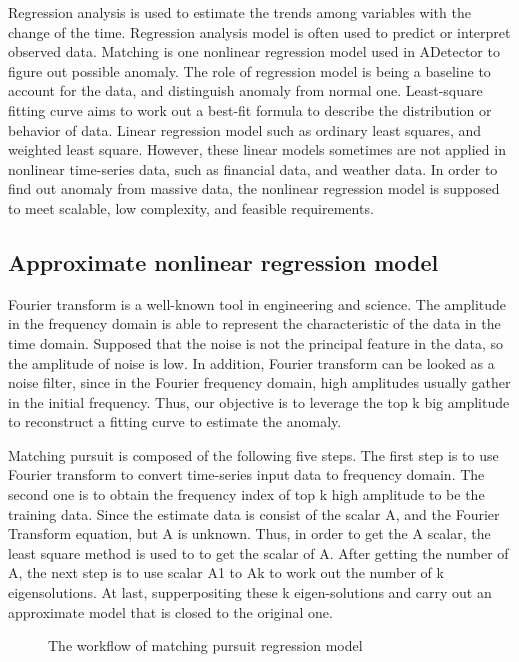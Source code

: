 \documentclass{vgtc}                          %
\begin{document}
Regression analysis is used to estimate the trends among variables with the change of the time. Regression analysis model is often used to predict or interpret observed data. Matching is one nonlinear regression model used in ADetector to figure out possible anomaly. The role of regression model is being a baseline to account for the data, and distinguish anomaly from normal one. Least-square fitting curve aims to work out a best-fit formula to describe the distribution or behavior of data. Linear regression model such as ordinary least squares, and weighted least square. However, these linear models sometimes are not applied in nonlinear time-series data, such as financial data, and weather data. In order to find out anomaly from massive data, the nonlinear regression model is supposed to meet scalable, low complexity, and feasible requirements.

\subsection{Approximate nonlinear regression model}

Fourier transform is a well-known tool in engineering and science. The amplitude in the frequency domain is able to represent the characteristic of the data in the time domain. Supposed that the noise is not the principal feature in the data, so the amplitude of noise is low. In addition, Fourier transform can be looked as a noise filter, since in the Fourier frequency domain, high amplitudes usually gather in the initial frequency. Thus, our objective is to leverage the top k big amplitude to reconstruct a fitting curve to estimate the anomaly. 

Matching pursuit is composed of the following five steps. The first step is to use Fourier transform to convert time-series input data to frequency domain. The second one is to obtain the frequency index of top k high amplitude to be the training data. Since the estimate data is consist of the scalar A, and the Fourier Transform equation, but A is unknown. Thus, in order to get the A scalar, the least square method is used to to get the scalar of A. After getting the number of A, the next step is to use scalar A1 to Ak to work out the number of k eigensolutions. At last, supperpositing these k eigen-solutions and carry out an approximate model that is closed to the original one.

\begin{figure}[htb]
	\caption{The workflow of matching pursuit regression model}
\end{figure}
\end{document}
